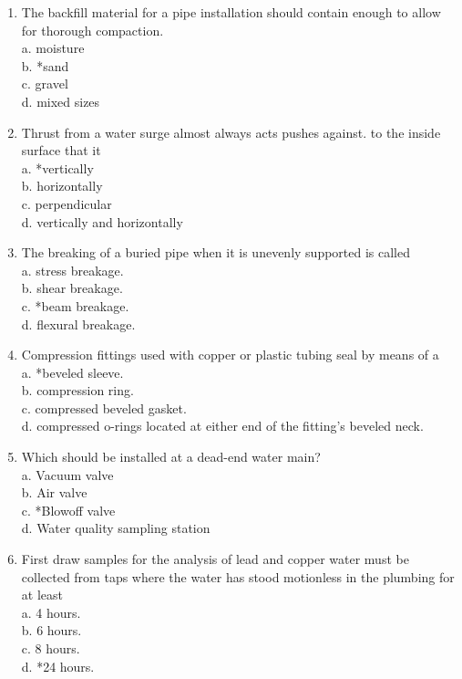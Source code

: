 \begin{enumerate}[1.]
  \item The backfill material for a pipe installation should contain enough to allow for thorough compaction.\\
a. moisture\\
b. *sand\\
c. gravel\\
d. mixed sizes

  \item Thrust from a water surge almost always acts pushes against. to the inside surface that it\\
a. *vertically\\
b. horizontally\\
c. perpendicular\\
d. vertically and horizontally

\item The breaking of a buried pipe when it is unevenly supported is called\\
a. stress breakage.\\
b. shear breakage.\\
c. *beam breakage.\\
d. flexural breakage.

  \item Compression fittings used with copper or plastic tubing seal by means of a\\
a. *beveled sleeve.\\
b. compression ring.\\
c. compressed beveled gasket.\\
d. compressed o-rings located at either end of the fitting's beveled neck. 

  \item Which should be installed at a dead-end water main?\\
a. Vacuum valve\\
b. Air valve\\
c. *Blowoff valve\\
d. Water quality sampling station



  \item First draw samples for the analysis of lead and copper water must be collected from taps where the water has stood motionless in the plumbing for at least\\
a. 4 hours.\\
b. 6 hours.\\
c. 8 hours.\\
d. *24 hours.


\end{enumerate}
